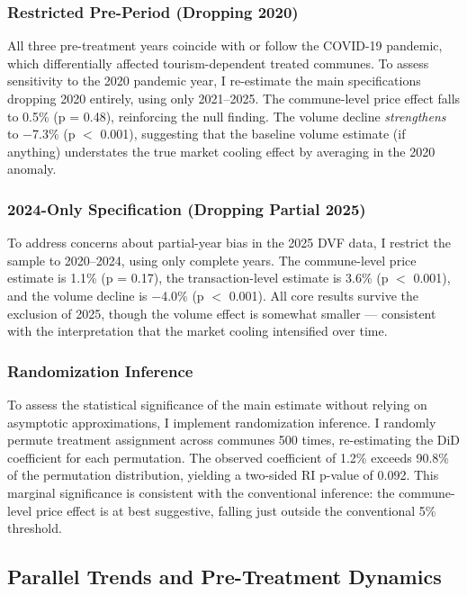 \documentclass[12pt]{article}
\begin{document}
\subsubsection{Restricted Pre-Period (Dropping 2020)}

All three pre-treatment years coincide with or follow the COVID-19 pandemic, which differentially affected tourism-dependent treated communes. To assess sensitivity to the 2020 pandemic year, I re-estimate the main specifications dropping 2020 entirely, using only 2021--2025. The commune-level price effect falls to 0.5\% (p = 0.48), reinforcing the null finding. The volume decline \textit{strengthens} to $-$7.3\% (p $<$ 0.001), suggesting that the baseline volume estimate (if anything) understates the true market cooling effect by averaging in the 2020 anomaly.

\subsubsection{2024-Only Specification (Dropping Partial 2025)}

To address concerns about partial-year bias in the 2025 DVF data, I restrict the sample to 2020--2024, using only complete years. The commune-level price estimate is 1.1\% (p = 0.17), the transaction-level estimate is 3.6\% (p $<$ 0.001), and the volume decline is $-$4.0\% (p $<$ 0.001). All core results survive the exclusion of 2025, though the volume effect is somewhat smaller --- consistent with the interpretation that the market cooling intensified over time.

\subsubsection{Randomization Inference}

To assess the statistical significance of the main estimate without relying on asymptotic approximations, I implement randomization inference. I randomly permute treatment assignment across communes 500 times, re-estimating the DiD coefficient for each permutation. The observed coefficient of 1.2\% exceeds 90.8\% of the permutation distribution, yielding a two-sided RI p-value of 0.092. This marginal significance is consistent with the conventional inference: the commune-level price effect is at best suggestive, falling just outside the conventional 5\% threshold.

\subsection{Parallel Trends and Pre-Treatment Dynamics}
\end{document}
